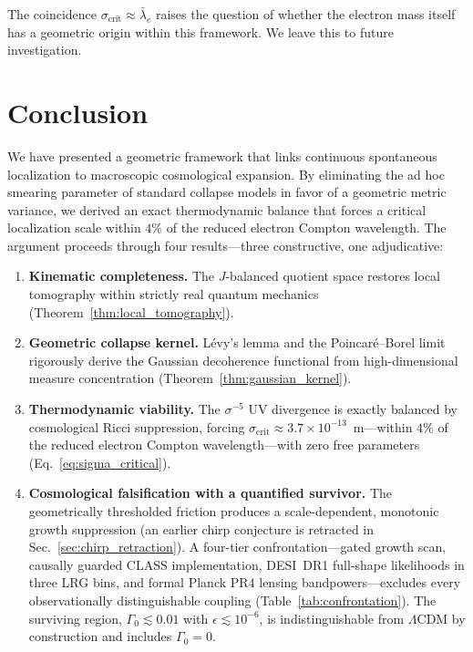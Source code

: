 \documentclass[aps,prd,twocolumn,superscriptaddress,nofootinbib]{revtex4-2}
\theoremstyle{definition}
\theoremstyle{remark}
\newcommand{\sigcrit}{\sigma_{\mathrm{crit}}}
\begin{document}
The coincidence $\sigcrit \approx \bar{\lambda}_e$ raises the question
of whether the electron mass itself has a geometric origin within this
framework. We leave this to future investigation.


\section{Conclusion}
\label{sec:conclusion}

We have presented a geometric framework that links continuous spontaneous
localization to macroscopic cosmological expansion. By eliminating the
ad hoc smearing parameter of standard collapse models in favor of a
geometric metric variance, we derived an exact thermodynamic balance
that forces a critical localization scale within $4\%$ of the reduced
electron Compton wavelength. The argument proceeds through four
results---three constructive, one adjudicative:

\begin{enumerate}
\item \textbf{Kinematic completeness.} The $J$-balanced quotient space
restores local tomography within strictly real quantum mechanics
(Theorem~\ref{thm:local_tomography}).

\item \textbf{Geometric collapse kernel.} L\'evy's lemma and the
Poincar\'e--Borel limit rigorously derive the Gaussian decoherence
functional from high-dimensional measure concentration
(Theorem~\ref{thm:gaussian_kernel}).

\item \textbf{Thermodynamic viability.} The $\sigma^{-5}$ UV divergence
is exactly balanced by cosmological Ricci suppression, forcing
$\sigcrit \approx 3.7 \times 10^{-13}$~m---within $4\%$ of the reduced
electron Compton wavelength---with zero free parameters
(Eq.~\eqref{eq:sigma_critical}).

\item \textbf{Cosmological falsification with a quantified survivor.}
The geometrically thresholded friction produces a scale-dependent,
monotonic growth suppression (an earlier chirp conjecture is retracted
in Sec.~\ref{sec:chirp_retraction}). A four-tier confrontation---gated
growth scan, causally guarded CLASS implementation, DESI~DR1
full-shape likelihoods in three LRG bins, and formal Planck PR4
lensing bandpowers---excludes every observationally distinguishable
coupling (Table~\ref{tab:confrontation}). The surviving region,
$\Gamma_0 \lesssim 0.01$ with $\epsilon \lesssim 10^{-6}$, is
indistinguishable from $\Lambda$CDM by construction and includes
$\Gamma_0 = 0$.
\end{enumerate}
\end{document}
